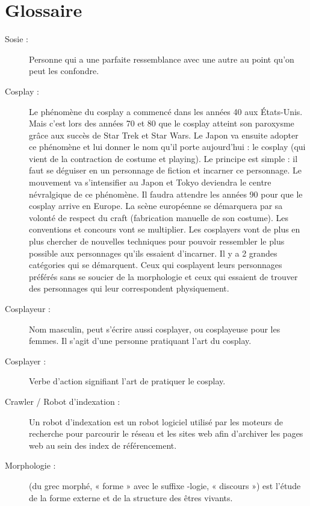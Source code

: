\documentclass[a4paper,12pt]{article}
\begin{document}
\section*{Glossaire}
\begin{description}
\item [Sosie :] Personne qui a une parfaite ressemblance avec une autre au point qu'on peut les confondre.
\item [Cosplay :] Le phénomène du cosplay a commencé dans les années 40 aux États-Unis. Mais c'est lors des années 70 et 80 que le cosplay atteint son paroxysme grâce aux succès de Star Trek et Star Wars. Le Japon va ensuite adopter ce phénomène et lui donner le nom qu'il porte aujourd'hui : le cosplay (qui vient de la contraction de costume et playing). Le principe est simple : il faut se déguiser en un personnage de fiction et incarner ce personnage. Le mouvement va s'intensifier au Japon et Tokyo deviendra le centre névralgique de ce phénomène. Il faudra attendre les années 90 pour que le cosplay arrive en Europe. La scène européenne se démarquera par sa volonté de respect du craft (fabrication manuelle de son costume). Les conventions et concours vont se multiplier. Les cosplayers vont de plus en plus chercher de nouvelles techniques pour pouvoir ressembler le plus possible aux personnages qu'ils essaient d'incarner. Il y a 2 grandes catégories qui se démarquent. Ceux qui cosplayent leurs personnages préférés sans se soucier de la morphologie et ceux qui essaient de trouver des personnages qui leur correspondent physiquement.
\item [Cosplayeur :] Nom masculin, peut s'écrire aussi cosplayer, ou cosplayeuse pour les femmes. Il s'agit d'une personne pratiquant l'art du cosplay.
\item [Cosplayer :] Verbe d'action signifiant l'art de pratiquer le cosplay. 
\item [Crawler / Robot d'indexation :] Un robot d’indexation est un robot logiciel utilisé par les moteurs de recherche pour parcourir le réseau et les sites web afin d’archiver les pages web au sein des index de référencement.
\item [Morphologie :] (du grec morphé, « forme » avec le suffixe -logie, « discours ») est l'étude de la forme externe et de la structure des êtres vivants.

\end{description}

\newpage
{}
\end{document}
